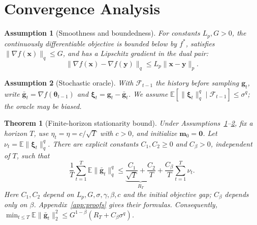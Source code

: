 \documentclass[10pt,a4paper]{amsart}
\newtheorem{assumption}{Assumption}
\newtheorem{theorem}{Theorem}
\begin{document}
\section{Convergence Analysis}
\label{sec:convergence}

\begin{assumption}[Smoothness and boundedness]\label{assum:regularity}
For constants $L_p,G>0$, the continuously differentiable objective is bounded below by $f^*$, satisfies $\|\nabla f(\mathbf{x})\|_q\le G$, and has a Lipschitz gradient in the dual pair:
\begin{equation}
\|\nabla f(\mathbf{x})-\nabla f(\mathbf{y})\|_q\le L_p\|\mathbf{x}-\mathbf{y}\|_p.
\end{equation}
\end{assumption}
\begin{assumption}[Stochastic oracle]\label{assum:oracle}
With $\mathcal F_{t-1}$ the history before sampling $\mathbf{g}_t$, write $\bar{\mathbf{g}}_t=\nabla f(\bm{\theta}_{t-1})$ and $\bm{\xi}_t=\mathbf{g}_t-\bar{\mathbf{g}}_t$. We assume $\mathbb E[\|\bm{\xi}_t\|_q^q\mid\mathcal F_{t-1}]\le\sigma^q$; the oracle may be biased.
\end{assumption}

\begin{theorem}[Finite-horizon stationarity bound]\label{thm:convergence}
Under Assumptions~\ref{assum:regularity}--\ref{assum:oracle}, fix a horizon $T$, use $\eta_t=\eta=c/\sqrt T$ with $c>0$, and initialize $\mathbf{m}_0=\mathbf{0}$. Let $\nu_t=\mathbb E\|\bm{\xi}_t\|_q^q$. There are explicit constants $C_1,C_2\ge0$ and $C_\beta>0$, independent of $T$, such that
\begin{equation}\label{eq:corrected-rate}
\frac1T\sum_{t=1}^T\mathbb E\|\bar{\mathbf{g}}_t\|_q^q
\le \underbrace{\frac{C_1}{\sqrt T}+\frac{C_2}{T}}_{R_T}
+\frac{C_\beta}{T}\sum_{t=1}^T\nu_t.
\end{equation}
Here $C_1,C_2$ depend on $L_p,G,\sigma,\gamma,\beta,c$ and the initial objective gap; $C_\beta$ depends only on $\beta$. Appendix~\ref{app:proofs} gives their formulas.
Consequently, $\min_{t\le T}\mathbb E\|\bar{\mathbf{g}}_t\|_2^2\le G^{1-\beta}(R_T+C_\beta\sigma^q)$.
\end{theorem}

\setcounter{equation}{20}
\FloatBarrier
\end{document}

